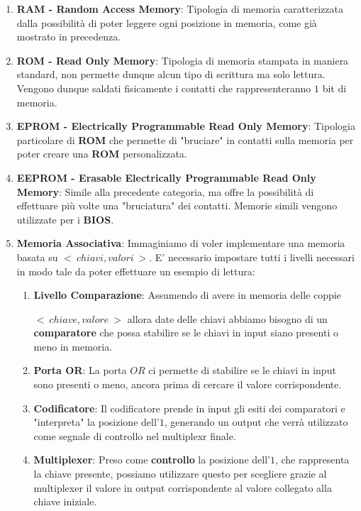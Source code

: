 \documentclass{article}
\begin{document}
\begin{enumerate}
    \item \textbf{RAM - Random Access Memory}: Tipologia di memoria caratterizzata dalla possibilità di poter leggere ogni posizione in memoria, come già mostrato in precedenza.
    \item \textbf{ROM - Read Only Memory}: Tipologia di memoria stampata in maniera standard, non permette dunque alcun tipo di scrittura ma solo lettura. Vengono dunque saldati fisicamente i contatti che rappresenteranno $1$ bit di memoria.
    \item \textbf{EPROM - Electrically Programmable Read Only Memory}: Tipologia particolare di \textbf{ROM} che permette di "bruciare" in contatti sulla memoria per poter creare una \textbf{ROM} personalizzata.
    \item \textbf{EEPROM - Erasable Electrically Programmable Read Only Memory}: Simile alla precedente categoria, ma offre la possibilità di effettuare più volte una "bruciatura" dei contatti. Memorie simili vengono utilizzate per i \textbf{BIOS}.

\newpage

    \item \textbf{Memoria Associativa}: Immaginiamo di voler implementare una memoria basata su $<\:chiavi,valori\:>$. E' necessario impostare tutti i livelli necessari in modo tale da poter effettuare un esempio di lettura:
    \begin{enumerate}
        \item \textbf{Livello Comparazione}: Assumendo di avere in memoria delle coppie
        
        $<\:chiave,valore\:>$ allora date delle chiavi abbiamo bisogno di un \textbf{comparatore} che possa stabilire se le chiavi in input siano presenti o meno in memoria.
        \item \textbf{Porta OR}: La porta $OR$ ci permette di stabilire se le chiavi in input sono presenti o meno, ancora prima di cercare il valore corrispondente.
        \item \textbf{Codificatore}: Il codificatore prende in input gli esiti dei comparatori e "interpreta" la posizione dell'$1$, generando un output che verrà utilizzato come segnale di controllo nel multiplexr finale.
        \item \textbf{Multiplexer}: Preso come \textbf{controllo} la posizione dell'$1$, che rappresenta la chiave presente, possiamo utilizzare questo per scegliere grazie al multiplexer il valore in output corrispondente al valore collegato alla chiave iniziale.
    \end{enumerate}


\end{enumerate}
\end{document}
